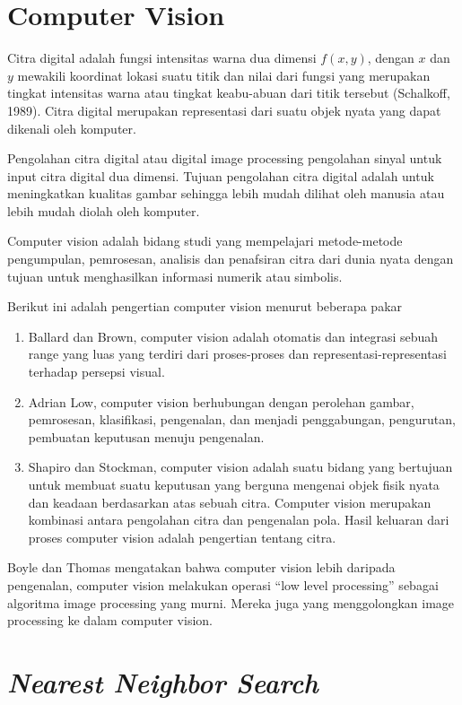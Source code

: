 \documentclass[laporan.tex]{subfiles}
\begin{document}
\section{Computer Vision}

Citra digital adalah fungsi intensitas warna dua dimensi $f(x,y)$, dengan $x$ dan $y$ mewakili koordinat lokasi suatu titik dan nilai dari fungsi yang merupakan tingkat intensitas warna atau tingkat keabu-abuan dari titik tersebut (Schalkoff, 1989). Citra digital merupakan representasi dari suatu objek nyata yang dapat dikenali oleh komputer.

Pengolahan citra digital atau digital image processing pengolahan sinyal untuk input citra digital dua dimensi. Tujuan pengolahan citra digital adalah untuk meningkatkan kualitas gambar sehingga lebih mudah dilihat oleh manusia atau lebih mudah diolah oleh komputer.

Computer vision adalah bidang studi yang mempelajari metode-metode pengumpulan, pemrosesan, analisis dan penafsiran citra dari dunia nyata dengan tujuan untuk menghasilkan informasi numerik atau simbolis.

Berikut ini adalah pengertian computer vision menurut beberapa pakar

\begin{enumerate}
\item Ballard dan Brown, computer vision adalah otomatis dan integrasi sebuah range yang luas yang terdiri dari proses-proses dan representasi-representasi terhadap persepsi visual.
\item Adrian Low, computer vision berhubungan dengan perolehan gambar, pemrosesan, klasifikasi, pengenalan, dan menjadi penggabungan, pengurutan, pembuatan keputusan menuju pengenalan.
\item Shapiro dan Stockman, computer vision adalah suatu bidang yang bertujuan untuk membuat suatu keputusan yang berguna mengenai objek fisik nyata dan keadaan berdasarkan atas sebuah citra. Computer vision merupakan kombinasi antara pengolahan citra dan pengenalan pola. Hasil keluaran dari proses computer vision adalah pengertian tentang citra.
\end{enumerate}

Boyle dan Thomas mengatakan bahwa computer vision lebih daripada pengenalan, computer vision melakukan operasi “low level processing” sebagai algoritma image processing yang murni. Mereka juga yang menggolongkan image processing ke dalam computer vision.

\section{\emph{Nearest Neighbor Search}}
\end{document}
